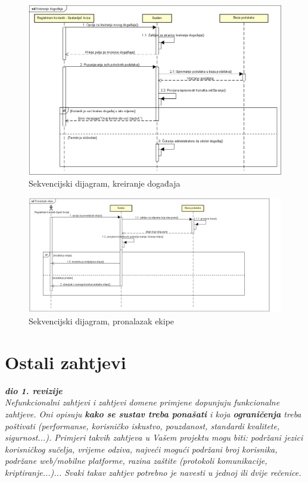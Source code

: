 				
				\begin{figure}[H]
					\includegraphics[width=\textwidth]{dijagrami/SekvencijskiKreiranjeDogadaja.PNG} 
					\caption{Sekvencijski dijagram, kreiranje događaja}
					\label{fig:SeqDiagram2}
				\end{figure}
				
				\eject
				
				\begin{figure}[H]
					\includegraphics[width=\textwidth]{dijagrami/SeqDiagram3.PNG} 
					\caption{Sekvencijski dijagram, pronalazak ekipe}
					\label{fig:SeqDiagram3}
				\end{figure}
				
				\eject

	
		\section{Ostali zahtjevi}
		
			\textbf{\textit{dio 1. revizije}}\\
		 
			 \textit{Nefunkcionalni zahtjevi i zahtjevi domene primjene dopunjuju funkcionalne zahtjeve. Oni opisuju \textbf{kako se sustav treba ponašati} i koja \textbf{ograničenja} treba poštivati (performanse, korisničko iskustvo, pouzdanost, standardi kvalitete, sigurnost...). Primjeri takvih zahtjeva u Vašem projektu mogu biti: podržani jezici korisničkog sučelja, vrijeme odziva, najveći mogući podržani broj korisnika, podržane web/mobilne platforme, razina zaštite (protokoli komunikacije, kriptiranje...)... Svaki takav zahtjev potrebno je navesti u jednoj ili dvije rečenice.}
			 
			 
			 
	